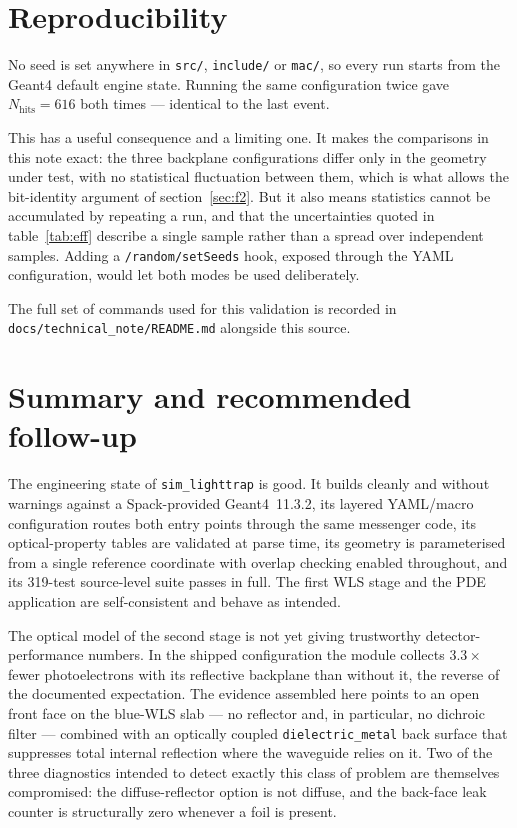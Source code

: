 \documentclass[a4paper,11pt]{article}
\begin{document}
\section{Reproducibility}
\label{sec:repro}

No seed is set anywhere in \texttt{src/}, \texttt{include/} or \texttt{mac/}, so
every run starts from the Geant4 default engine state. Running the same
configuration twice gave $N_{\text{hits}}=616$ both times --- identical to the
last event.

This has a useful consequence and a limiting one. It makes the comparisons in
this note exact: the three backplane configurations differ only in the geometry
under test, with no statistical fluctuation between them, which is what allows
the bit-identity argument of section~\ref{sec:f2}. But it also means statistics
cannot be accumulated by repeating a run, and that the uncertainties quoted in
table~\ref{tab:eff} describe a single sample rather than a spread over
independent samples. Adding a \texttt{/random/setSeeds} hook, exposed through
the YAML configuration, would let both modes be used deliberately.

The full set of commands used for this validation is recorded in
\texttt{docs/technical\_note/README.md} alongside this source.

\section{Summary and recommended follow-up}
\label{sec:summary}

The engineering state of \texttt{sim\_lighttrap} is good. It builds cleanly and
without warnings against a Spack-provided Geant4~11.3.2, its layered
YAML/macro configuration routes both entry points through the same messenger
code, its optical-property tables are validated at parse time, its geometry is
parameterised from a single reference coordinate with overlap checking enabled
throughout, and its 319-test source-level suite passes in full. The first WLS
stage and the PDE application are self-consistent and behave as intended.

The optical model of the second stage is not yet giving trustworthy
detector-performance numbers. In the shipped configuration the module collects
$3.3\times$ fewer photoelectrons with its reflective backplane than without it,
the reverse of the documented expectation. The evidence assembled here points to
an open front face on the blue-WLS slab --- no reflector and, in particular, no
dichroic filter --- combined with an optically coupled \texttt{dielectric\_metal}
back surface that suppresses total internal reflection where the waveguide
relies on it. Two of the three diagnostics intended to detect exactly this class
of problem are themselves compromised: the diffuse-reflector option is not
diffuse, and the back-face leak counter is structurally zero whenever a foil is
present.
\end{document}
